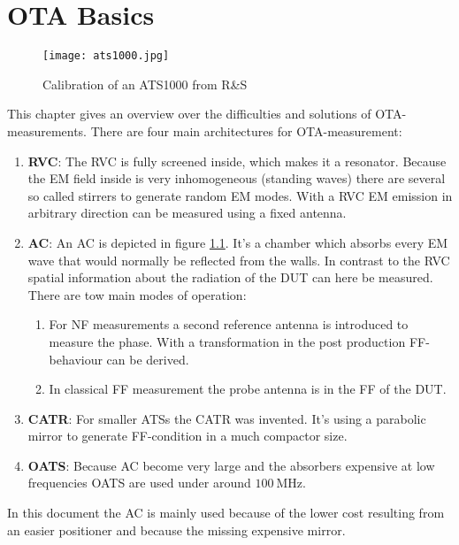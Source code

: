 \chapter{OTA Basics}


\begin{figure}[H]
\centering
\texttt{[image: ats1000.jpg]}
\caption{Calibration of an ATS1000 from R\&{}S}
\label{fig:ats}
\end{figure}

This chapter gives an overview over the difficulties and solutions of \ac{OTA}-measurements. There are four main architectures for \ac{OTA}-measurement: \cite{ach}

\begin{enumerate}
\item \textbf{\acf{RVC}}: The \ac{RVC} is fully screened inside, which makes it a resonator. Because the \ac{EM} field inside is very inhomogeneous (standing waves) there are several so called stirrers to generate random \ac{EM} modes. With a \ac{RVC} \ac{EM} emission in arbitrary direction can be measured using a fixed antenna.
\item \textbf{\acf{AC}}: An \ac{AC} is depicted in figure \ref{fig:ats}. It's a chamber which absorbs every \ac{EM} wave that would normally be reflected from the walls. In contrast to the \ac{RVC} spatial information about the radiation of the \ac{DUT} can here be measured. There are tow main modes of operation:\begin{enumerate}
\item For \ac{NF} measurements a second reference antenna is introduced to measure the phase. With a transformation in the post production \ac{FF}-behaviour can be derived.
\item In classical \ac{FF} measurement the probe antenna is in the \ac{FF} of the \ac{DUT}.
\end{enumerate}
\item \textbf{\acf{CATR}}: For smaller \acp{ATS} the \ac{CATR} was invented. It's using a parabolic mirror to generate \ac{FF}-condition in a much compactor size.
\item \textbf{\acf{OATS}}: Because \ac{AC} become very large and the absorbers expensive at low frequencies \ac{OATS} are used under around $\SI{100}{\mega\hertz}$.
\end{enumerate}

In this document the \ac{AC} is mainly used because of the lower cost resulting from an easier positioner and because the missing expensive mirror.

